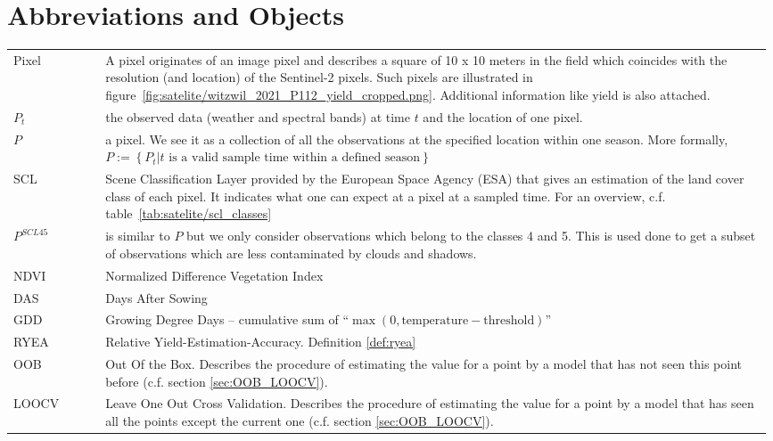 \section*{Abbreviations and Objects}
\begin{longtable}{p{0.12\linewidth} p{0.87\linewidth}}
Pixel	
		& A pixel originates of an image pixel and describes a square of 10 x 10 meters in the field which coincides with the resolution (and location) of the Sentinel-2 pixels. Such pixels are illustrated in figure~\ref{fig:satelite/witzwil_2021_P112_yield_cropped.png}. Additional information like yield is also attached.\\

$P_t$	
		& the observed data (weather and spectral bands) at time $t$ and the location of one pixel. \\

$P$	
		& a pixel. We see it as a collection of all the observations at the specified location within one season. More formally, $P := \left\{P_t | t\text{ is a valid sample time within a defined season}\right\}$\\

SCL	
		& Scene Classification Layer provided by the European Space Agency (ESA) that gives an estimation of the land cover class of each pixel. It indicates what one can expect at a pixel at a sampled time. For an overview, c.f. table~\ref{tab:satelite/scl_classes}\\

$P^{SCL45}$	
		& is similar to $P$ but we only consider observations which belong to the classes 4 and 5. This is used done to get a subset of observations which are less contaminated by clouds and shadows.\\

NDVI	
		& Normalized Difference Vegetation Index \citep{rouseMonitoringVernalAdvancement1974}\\

DAS	
		& Days After Sowing\\

GDD	
		& Growing Degree Days -- cumulative sum of ``$\max(0, \text{temperature}-\text{threshold})$''\\

RYEA 	
		& Relative Yield-Estimation-Accuracy. Definition \ref{def:ryea}\\

OOB 	
		& Out Of the Box. Describes the procedure of  estimating the value for a point by a model that has not seen this point before (c.f. section \ref{sec:OOB_LOOCV}).\\

LOOCV 	
		& Leave One Out Cross Validation. Describes the procedure of estimating the value for a point by a model that has seen all the points except the current one (c.f. section \ref{sec:OOB_LOOCV}).\\
\end{longtable} 

